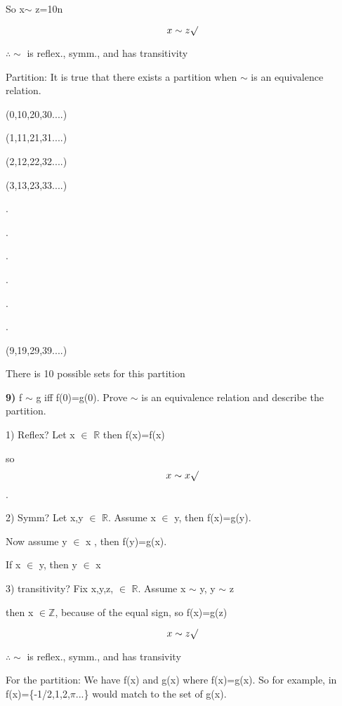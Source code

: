 \documentclass{article}
\begin{document}
So x$\sim$ z=10n


$$x\sim z \surd$$

$\therefore \sim$ is reflex., symm., and has transitivity
\newpage

Partition: It is true that there exists a partition when $\sim$ is an equivalence relation.

\medskip


(0,10,20,30....)


(1,11,21,31....)


(2,12,22,32....)


(3,13,23,33....)

.

.

.

.


.

.

(9,19,29,39....)

There is 10 possible sets for this partition



\newpage

\textbf{9)} f $\sim$ g iff f(0)=g(0). Prove $\sim$ is an equivalence relation and describe the partition.

1) Reflex? Let x $\in$ $\mathbb{R}$ 
then f(x)=f(x)

so $$x \sim x \surd$$.

\medskip

2) Symm? Let x,y $\in$ $\mathbb{R}$. Assume x $\in$ y, then f(x)=g(y).

Now assume y $\in$ x , then f(y)=g(x).

If x $\in$ y, then y $\in$ x 

\medskip

3) transitivity? Fix x,y,z, $\in$ $\mathbb{R}$. Assume x $\sim$ y, y $\sim$ z

then x $\in \mathbb{ Z}$, because of the equal sign, so f(x)=g(z)

$$x  \sim z\surd$$
\begin{center}
$\therefore \sim$ is reflex., symm., and has transivity 
\end{center}

For the partition: We have f(x) and g(x) where f(x)=g(x).
So for example, in f(x)=\{-1/2,1,2,$\pi$...\} would match to the set of g(x).




\newpage
\end{document}
